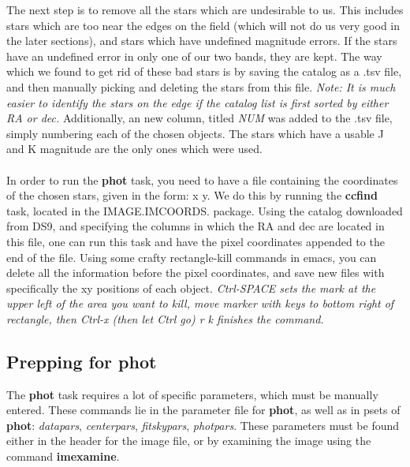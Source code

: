\documentclass[a4paper]{article}
\begin{document}
The next step is to remove all the stars which are undesirable to us.  This includes stars which are too near the edges on the field (which will not do us very good in the later sections), and stars which have undefined magnitude errors.  If the stars have an undefined error in only one of our two bands, they are kept.  The way which we found to get rid of these bad stars is by saving the catalog as a .tsv file, and then manually picking and deleting the stars from this file.  \textit{Note: It is much easier to identify the stars on the edge if the catalog list is first sorted by either RA or dec.}  Additionally, an new column, titled \textit{NUM} was added to the .tsv file, simply numbering each of the chosen objects.  The stars which have a usable J and K magnitude are the only ones which were used.  \\ \\
In order to run the \textbf{phot} task, you need to have a file containing the coordinates of the chosen stars, given in the form:  x  y.  We do this  by running the \textbf{ccfind} task, located in the IMAGE.IMCOORDS. package.  Using the catalog downloaded from DS9, and specifying the columns in which the RA and dec are located in this file, one can run this task and have the pixel coordinates appended to the end of the file.  Using some crafty rectangle-kill commands in emacs, you can delete all the information before the pixel coordinates, and save new files with specifically the xy positions of each object.  \textit{Ctrl-SPACE sets the mark at the upper left of the area you want to kill, move marker with keys to bottom right of rectangle, then Ctrl-x (then let Ctrl go) r k finishes the command.}

\subsection{Prepping for phot}
The \textbf{phot} task requires a lot of specific parameters, which must be manually entered.  These commands lie in the parameter file for \textbf{phot}, as well as in psets of \textbf{phot}: \textit{datapars}, \textit{centerpars}, \textit{fitskypars}, \textit{photpars}.  These parameters must be found either in the header for the image file, or by examining the image using the command \textbf{imexamine}.  
\end{document}
